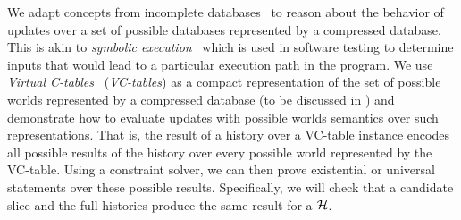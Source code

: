 We adapt concepts from incomplete databases~\cite{IL84a} to reason about the behavior of updates over a set of possible databases represented by a compressed database. This is akin to \textit{symbolic execution}~\cite{cadar13,K76} which is used in software testing to determine inputs that would lead to a particular execution path in the program.
We use \textit{Virtual C-tables}~\cite{pip10,lenses15} (\textit{VC-tables}) as a compact representation of the set of possible worlds represented by a compressed database (to be discussed in ) and demonstrate how to evaluate updates with possible worlds semantics over such representations. That is, the result of a history over a VC-table instance encodes all possible results of the history over every possible world represented by the VC-table. Using a constraint solver, we can then prove existential or universal statements over these possible results. Specifically, we will check that a candidate slice and the full histories produce the same result for a \abbrHW $\mathcal{H}$.




